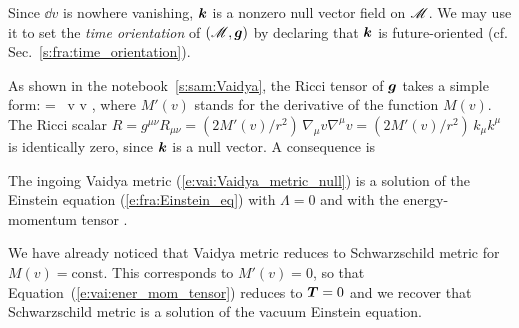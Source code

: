 \begin{prop}
Since $\dd v$ is nowhere vanishing, $\bm{k}$ is a nonzero null vector field on $\mathscr{M}$.
We may use it to set the \emph{time orientation} of $(\mathscr{M},\bm{g})$
by declaring that $\bm{k}$ is future-oriented (cf. Sec.~\ref{s:fra:time_orientation}).
\end{prop}

As shown in the notebook~\ref{s:sam:Vaidya},
the Ricci tensor of $\bm{g}$ takes a simple form:
\be \label{e:vai:Ricci_tensor}
     = \, \dd v \otimes \dd v ,
\ee
where $M'(v)$ stands for the derivative of the function $M(v)$.
The Ricci scalar $R = g^{\mu\nu} R_{\mu\nu} = (2M'(v)/r^2) \, \nabla_\mu v \nabla^\mu v =  (2M'(v)/r^2) \, k_\mu k^\mu$ is identically zero, since $\bm{k}$ is a null vector.
A consequence is
\begin{prop}
The ingoing Vaidya metric (\ref{e:vai:Vaidya_metric_null}) is a solution
of the Einstein equation (\ref{e:fra:Einstein_eq})
with $\Lambda = 0$ and with the energy-momentum tensor
\be \label{e:vai:ener_mom_tensor}
    .
\ee
\end{prop}

\begin{remark}
We have already noticed that Vaidya metric reduces to Schwarzschild metric for $M(v) = \mathrm{const}$.
This corresponds to $M'(v) = 0$, so that
Equation~(\ref{e:vai:ener_mom_tensor}) reduces to $\bm{T} = 0$ and we recover that
Schwarzschild metric is a solution of the vacuum Einstein equation.
\end{remark}


